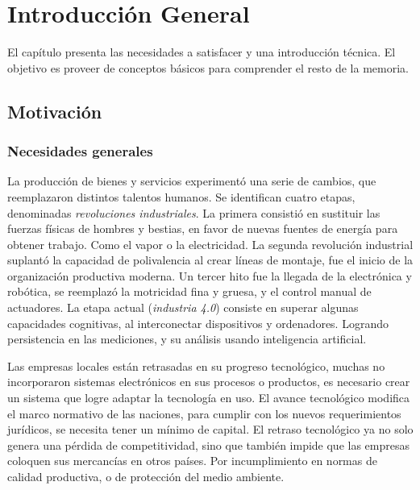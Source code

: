 \chapter{Introducción General}

\label{Chapter1}
\label{IntroGeneral}


\newcommand{\keyword}[1]{\textbf{#1}}
\newcommand{\tabhead}[1]{\textbf{#1}}
\newcommand{\code}[1]{\texttt{#1}}
\newcommand{\file}[1]{\texttt{\bfseries#1}}
\newcommand{\option}[1]{\texttt{\itshape#1}}
\newcommand{\grados}{$^{\circ}$}


El capítulo presenta las necesidades a satisfacer y una introducción técnica. El objetivo es proveer de conceptos básicos para comprender el resto de la memoria.

\section{Motivación}
\label{motivacion}

	\subsection{Necesidades generales}
	
		La producción de bienes y servicios experimentó una serie de cambios, que reemplazaron distintos talentos humanos. Se identifican cuatro etapas, denominadas \emph{revoluciones industriales}. La primera consistió en sustituir las fuerzas físicas de hombres y bestias, en favor de nuevas fuentes de energía para obtener trabajo. Como el vapor o la electricidad. La segunda revolución industrial suplantó la capacidad de polivalencia al crear líneas de montaje, fue el inicio de la organización productiva moderna. Un tercer hito fue la llegada de la electrónica y robótica, se reemplazó la motricidad fina y gruesa, y el control manual de actuadores. La etapa actual (\emph{industria 4.0}) consiste en superar algunas capacidades cognitivas, al interconectar dispositivos y ordenadores. Logrando persistencia en las mediciones, y su análisis usando inteligencia artificial.

		Las empresas locales están retrasadas en su progreso tecnológico, muchas no incorporaron sistemas electrónicos en sus procesos o productos, es necesario crear un sistema que logre adaptar la tecnología en uso. El avance tecnológico modifica el marco normativo de las naciones, para cumplir con los nuevos requerimientos jurídicos, se necesita tener un mínimo de capital. El retraso tecnológico ya no solo genera una pérdida de competitividad, sino que también impide que las empresas coloquen sus mercancías en otros países. Por incumplimiento en normas de calidad productiva, o de protección del medio ambiente.

